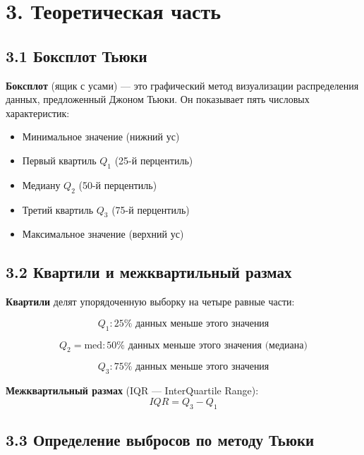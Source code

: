 \documentclass[a4paper,14pt]{extarticle}
\begin{document}
\section*{3. Теоретическая часть}

\subsection*{3.1 Боксплот Тьюки}

\textbf{Боксплот} (ящик с усами) — это графический метод визуализации распределения данных, предложенный Джоном Тьюки. Он показывает пять числовых характеристик:
\begin{itemize}
    \item Минимальное значение (нижний ус)
    \item Первый квартиль $Q_1$ (25-й перцентиль)
    \item Медиану $Q_2$ (50-й перцентиль)
    \item Третий квартиль $Q_3$ (75-й перцентиль)
    \item Максимальное значение (верхний ус)
\end{itemize}

\subsection*{3.2 Квартили и межквартильный размах}

\textbf{Квартили} делят упорядоченную выборку на четыре равные части:

\begin{equation}
Q_1: 25\% \text{ данных меньше этого значения}
\end{equation}

\begin{equation}
Q_2 = \text{med}: 50\% \text{ данных меньше этого значения (медиана)}
\end{equation}

\begin{equation}
Q_3: 75\% \text{ данных меньше этого значения}
\end{equation}

\textbf{Межквартильный размах} (IQR — InterQuartile Range):
\begin{equation}
IQR = Q_3 - Q_1
\end{equation}

\subsection*{3.3 Определение выбросов по методу Тьюки}
\end{document}
